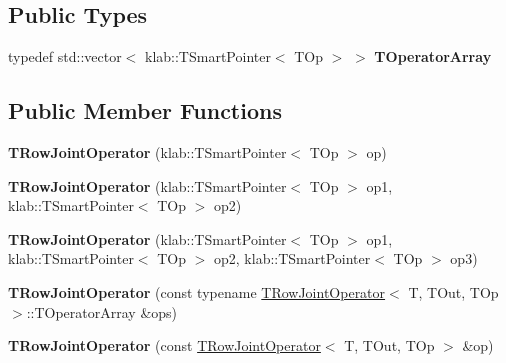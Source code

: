 \subsection*{Public Types}
\begin{DoxyCompactItemize}
\item 
typedef std\+::vector$<$ klab\+::\+T\+Smart\+Pointer$<$ T\+Op $>$ $>$ {\bfseries T\+Operator\+Array}\hypertarget{classkl1p_1_1TRowJointOperator_a6dc82e709d41cb3dc0ec1dc7e34a168e}{}\label{classkl1p_1_1TRowJointOperator_a6dc82e709d41cb3dc0ec1dc7e34a168e}

\end{DoxyCompactItemize}
\subsection*{Public Member Functions}
\begin{DoxyCompactItemize}
\item 
{\bfseries T\+Row\+Joint\+Operator} (klab\+::\+T\+Smart\+Pointer$<$ T\+Op $>$ op)\hypertarget{classkl1p_1_1TRowJointOperator_a8933c2fad5b50fa5dd3e341d8be06a4f}{}\label{classkl1p_1_1TRowJointOperator_a8933c2fad5b50fa5dd3e341d8be06a4f}

\item 
{\bfseries T\+Row\+Joint\+Operator} (klab\+::\+T\+Smart\+Pointer$<$ T\+Op $>$ op1, klab\+::\+T\+Smart\+Pointer$<$ T\+Op $>$ op2)\hypertarget{classkl1p_1_1TRowJointOperator_aab3a075e9c21d7fe301fce194a79b020}{}\label{classkl1p_1_1TRowJointOperator_aab3a075e9c21d7fe301fce194a79b020}

\item 
{\bfseries T\+Row\+Joint\+Operator} (klab\+::\+T\+Smart\+Pointer$<$ T\+Op $>$ op1, klab\+::\+T\+Smart\+Pointer$<$ T\+Op $>$ op2, klab\+::\+T\+Smart\+Pointer$<$ T\+Op $>$ op3)\hypertarget{classkl1p_1_1TRowJointOperator_a61c4df996eb6a3545a2360b84e417d72}{}\label{classkl1p_1_1TRowJointOperator_a61c4df996eb6a3545a2360b84e417d72}

\item 
{\bfseries T\+Row\+Joint\+Operator} (const typename \hyperlink{classkl1p_1_1TRowJointOperator}{T\+Row\+Joint\+Operator}$<$ T, T\+Out, T\+Op $>$\+::T\+Operator\+Array \&ops)\hypertarget{classkl1p_1_1TRowJointOperator_acca57bfdcfd4c46bc83c7cd88d1c529b}{}\label{classkl1p_1_1TRowJointOperator_acca57bfdcfd4c46bc83c7cd88d1c529b}

\item 
{\bfseries T\+Row\+Joint\+Operator} (const \hyperlink{classkl1p_1_1TRowJointOperator}{T\+Row\+Joint\+Operator}$<$ T, T\+Out, T\+Op $>$ \&op)\hypertarget{classkl1p_1_1TRowJointOperator_ad792442315b44b99421330f9d3477c08}{}\label{classkl1p_1_1TRowJointOperator_ad792442315b44b99421330f9d3477c08}


\end{DoxyCompactItemize}
